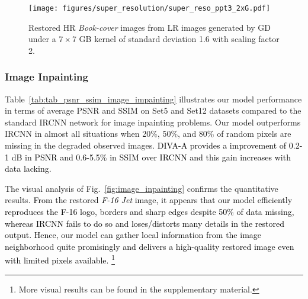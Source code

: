 \documentclass[10pt,journal,compsoc]{IEEEtran}
\newcommand{\sd}{\textcolor{black}}
\newcommand{\dk}{\textcolor{black}}
\begin{document}
\begin{figure}[t!]
\begin{centering}

\texttt{[image: figures/super\_resolution/super\_reso\_ppt3\_2xG.pdf]}

\end{centering}
\caption{Restored HR \textit{Book-cover} images from LR images generated by GD under a $7 \times 7$ GB kernel of standard deviation 1.6 with scaling factor 2.}
\label{fig:image_super_resoGx2}
\end{figure}










\subsubsection{Image Inpainting}
\label{sec:result_inpaint}


Table~\ref{tab:tab_psnr_ssim_image_impainting} illustrates our model performance in terms of average PSNR and SSIM on Set5 and Set12 datasets compared to the standard IRCNN network for image inpainting problems. Our model outperforms IRCNN in almost all situations when 20\%, 50\%, and 80\% of random pixels are missing in the degraded observed images. \sd{DIVA-A provides a improvement of 0.2-1 dB in PSNR and 0.6-5.5\% in SSIM over IRCNN and this gain increases with data lacking.}




The visual analysis of Fig.~\ref{fig:image_inpainting} confirms the quantitative results. \sd{From the restored \textit{F-16 Jet} image, it appears that our model efficiently reproduces the F-16 logo, borders and sharp edges \sd{despite 50\% of data missing}, whereas IRCNN fails to do so and loses/distorts many details in the restored output. 
Hence, our model can gather local information from the image neighborhood quite promisingly and delivers a high-quality restored image even with limited pixels available.}
\footnote{More visual results can be found in the supplementary material.}
\end{document}
